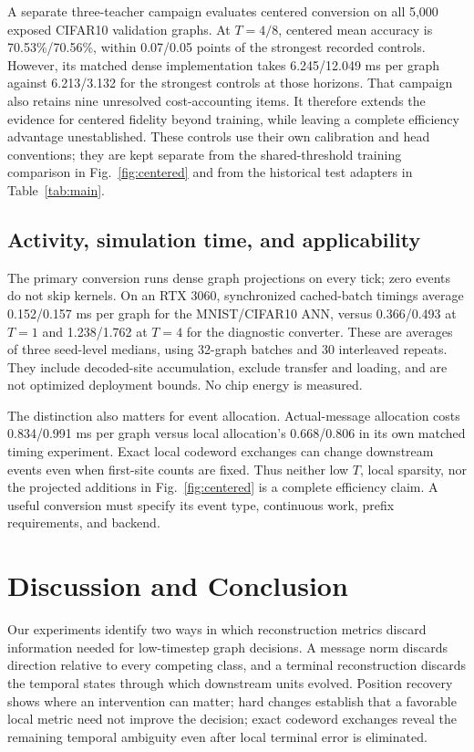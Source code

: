 \documentclass[10pt,twocolumn,letterpaper]{article}
\begin{document}
A separate three-teacher campaign evaluates centered conversion on all 5,000 exposed CIFAR10 validation graphs. At $T=4/8$, centered mean accuracy is 70.53\%/70.56\%, within 0.07/0.05 points of the strongest recorded controls. However, its matched dense implementation takes 6.245/12.049 ms per graph against 6.213/3.132 for the strongest controls at those horizons. That campaign also retains nine unresolved cost-accounting items. It therefore extends the evidence for centered fidelity beyond training, while leaving a complete efficiency advantage unestablished. These controls use their own calibration and head conventions; they are kept separate from the shared-threshold training comparison in Fig.~\ref{fig:centered} and from the historical test adapters in Table~\ref{tab:main}.

\subsection{Activity, simulation time, and applicability}
The primary conversion runs dense graph projections on every tick; zero events do not skip kernels. On an RTX 3060, synchronized cached-batch timings average 0.152/0.157 ms per graph for the MNIST/CIFAR10 ANN, versus 0.366/0.493 at $T=1$ and 1.238/1.762 at $T=4$ for the diagnostic converter. These are averages of three seed-level medians, using 32-graph batches and 30 interleaved repeats. They include decoded-site accumulation, exclude transfer and loading, and are not optimized deployment bounds. No chip energy is measured.

The distinction also matters for event allocation. Actual-message allocation costs 0.834/0.991 ms per graph versus local allocation's 0.668/0.806 in its own matched timing experiment. Exact local codeword exchanges can change downstream events even when first-site counts are fixed. Thus neither low $T$, local sparsity, nor the projected additions in Fig.~\ref{fig:centered} is a complete efficiency claim. A useful conversion must specify its event type, continuous work, prefix requirements, and backend.

\section{Discussion and Conclusion}
Our experiments identify two ways in which reconstruction metrics discard information needed for low-timestep graph decisions. A message norm discards direction relative to every competing class, and a terminal reconstruction discards the temporal states through which downstream units evolved. Position recovery shows where an intervention can matter; hard changes establish that a favorable local metric need not improve the decision; exact codeword exchanges reveal the remaining temporal ambiguity even after local terminal error is eliminated.
\end{document}
